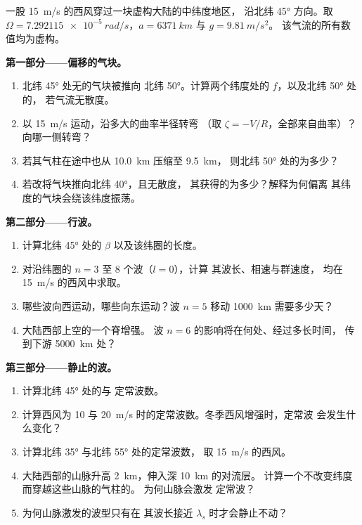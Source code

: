 \begin{problem}
\label{pb:b3:atmospheric-dynamics:1}
一股 \qty{15}{m/s} 的西风穿过一块虚构大陆的中纬度地区，
沿北纬 \ang{45} 方向。取 $\Omega =
\qty{7.292115e-5}{rad/s}$，$a = \qty{6371}{km}$ 与 $g = \qty{9.81}{m/s^2}$。
该气流的所有数值均为虚构。

\medskip\noindent\textbf{第一部分——偏移的气块。}
\begin{enumerate}
\item 北纬 \ang{45} 处无的气块被推向
  北纬 \ang{50}。计算两个纬度处的 $f$，以及北纬 \ang{50} 处的，
  若气流无散度。
\item 以 \qty{15}{m/s} 运动，沿多大的曲率半径转弯
  （取 $\zeta = -V/R$，全部来自曲率）？向哪一侧转弯？
\item 若其气柱在途中也从 \qty{10.0}{km} 压缩至 \qty{9.5}{km}，
  则北纬 \ang{50} 处的为多少？
\item 若改将气块推向北纬 \ang{40}，且无散度，
  其获得的为多少？解释为何偏离
  其纬度的气块会绕该纬度振荡。
\end{enumerate}

\medskip\noindent\textbf{第二部分——行波。}
\begin{enumerate}[resume]
\item 计算北纬 \ang{45} 处的 $\beta$ 以及该纬圈的长度。
\item 对沿纬圈的 $n = 3$ 至 8 个波（$l = 0$），计算
  其波长、相速与群速度，
  均在 \qty{15}{m/s} 的西风中求取。
\item 哪些波向西运动，哪些向东运动？波
  $n = 5$ 移动 \qty{1000}{km} 需要多少天？
\item 大陆西部上空的一个脊增强。
  波 $n = 6$ 的影响将在何处、经过多长时间，
  传到下游 \qty{5000}{km} 处？
\end{enumerate}

\medskip\noindent\textbf{第三部分——静止的波。}
\begin{enumerate}[resume]
\item 计算北纬 \ang{45} 处的与
  定常波数。
\item 计算西风为 10 与
  \qty{20}{m/s} 时的定常波数。冬季西风增强时，定常波
  会发生什么变化？
\item 计算北纬 \ang{35} 与北纬 \ang{55} 处的定常波数，
  取 \qty{15}{m/s} 的西风。
\item 大陆西部的山脉升高 \qty{2}{km}，伸入深 \qty{10}{km} 的对流层。
  计算一个不改变纬度而穿越这些山脉的气柱的。
  为何山脉会激发
  定常波？
\item 为何山脉激发的波型只有在
  其波长接近 $\lambda_s$ 时才会静止不动？
\end{enumerate}


\end{problem}
